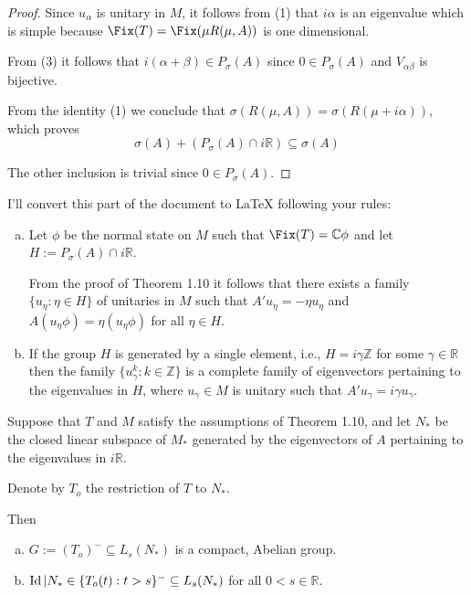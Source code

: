 \begin{proof}
Since $u_{\alpha}$ is unitary in $M$, it follows from (1) that $i\alpha$ is an eigenvalue which is simple because $\Fix(T) = \Fix(\mu R(\mu,A))$ is one dimensional.

From (3) it follows that $i(\alpha+\beta) \in P_{\sigma}(A)$ since $0 \in P_{\sigma}(A)$ and $V_{\alpha\beta}$ is bijective.

From the identity (1) we conclude that $\sigma(R(\mu,A)) = \sigma(R(\mu+i\alpha))$, which proves
\[
\sigma(A) + (P_{\sigma}(A) \cap i\mathbb{R}) \subseteq \sigma(A)
\]

The other inclusion is trivial since $0 \in P_{\sigma}(A)$.
\end{proof}


I'll convert this part of the document to LaTeX following your rules:

\begin{remarks}\label{rem:d3-1-11}
\begin{enumerate}[(a)]
\item Let $\phi$ be the normal state on $M$ such that $\Fix(T) = \mathbb{C}\phi$ and let $H := P_{\sigma}(A) \cap i\mathbb{R}$.

From the proof of Theorem 1.10 it follows that there exists a family $\{u_{\eta} : \eta \in H\}$ of unitaries in $M$ such that $A'u_{\eta} = -\eta u_{\eta}$ and $A(u_{\eta}\phi) = \eta(u_{\eta}\phi)$ for all $\eta \in H$.

\item If the group $H$ is generated by a single element, i.e., $H = i\gamma\mathbb{Z}$ for some $\gamma \in \mathbb{R}$ then the family $\{u_{\gamma}^{k} : k \in \mathbb{Z}\}$ is a complete family of eigenvectors pertaining to the eigenvalues in $H$, where $u_{\gamma} \in M$ is unitary such that $A'u_{\gamma} = i\gamma u_{\gamma}$.
\end{enumerate}
\end{remarks}

\begin{proposition}\label{prop:d3-1-12}
Suppose that $T$ and $M$ satisfy the assumptions of Theorem 1.10, and let $N_{*}$ be the closed linear subspace of $M_{*}$ generated by the eigenvectors of $A$ pertaining to the eigenvalues in $i\mathbb{R}$.

Denote by $T_{o}$ the restriction of $T$ to $N_{*}$.

Then
\begin{enumerate}[(a)]
\item $G := (T_{o})^{-} \subseteq L_{s}(N_{*})$ is a compact, Abelian group.

\item $\operatorname{Id}|N_{*}\in\{T_{o}(t) : t>s\}^{-} \subseteq L_{s}(N_{*})$ for all $0<s \in \mathbb{R}$.
\end{enumerate}
\end{proposition}

